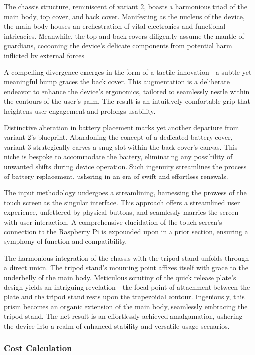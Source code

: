 The chassis structure, reminiscent of variant 2, boasts a harmonious triad of the main body, top cover, and back cover. Manifesting as the nucleus of the device, the main body houses an orchestration of vital electronics and functional intricacies. Meanwhile, the top and back covers diligently assume the mantle of guardians, cocooning the device's delicate components from potential harm inflicted by external forces.

A compelling divergence emerges in the form of a tactile innovation—a subtle yet meaningful bump graces the back cover. This augmentation is a deliberate endeavor to enhance the device's ergonomics, tailored to seamlessly nestle within the contours of the user's palm. The result is an intuitively comfortable grip that heightens user engagement and prolongs usability.

Distinctive alteration in battery placement marks yet another departure from variant 2's blueprint. Abandoning the concept of a dedicated battery cover, variant 3 strategically carves a snug slot within the back cover's canvas. This niche is bespoke to accommodate the battery, eliminating any possibility of unwanted shifts during device operation. Such ingenuity streamlines the process of battery replacement, ushering in an era of swift and effortless renewals.

The input methodology undergoes a streamlining, harnessing the prowess of the touch screen as the singular interface. This approach offers a streamlined user experience, unfettered by physical buttons, and seamlessly marries the screen with user interaction. A comprehensive elucidation of the touch screen's connection to the Raspberry Pi is expounded upon in a prior section, ensuring a symphony of function and compatibility.

The harmonious integration of the chassis with the tripod stand unfolds through a direct union. The tripod stand's mounting point affixes itself with grace to the underbelly of the main body. Meticulous scrutiny of the quick release plate's design yields an intriguing revelation—the focal point of attachment between the plate and the tripod stand rests upon the trapezoidal contour. Ingeniously, this prism becomes an organic extension of the main body, seamlessly embracing the tripod stand. The net result is an effortlessly achieved amalgamation, ushering the device into a realm of enhanced stability and versatile usage scenarios.

\subsubsection{Cost Calculation}

